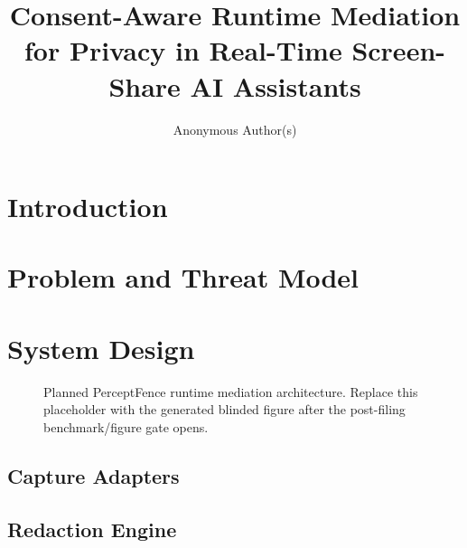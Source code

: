 \documentclass[manuscript,review,anonymous]{acmart}
\title[Consent-Aware Runtime Mediation for Screen-Share AI]{Consent-Aware Runtime Mediation for Privacy in Real-Time Screen-Share AI Assistants}
\author{Anonymous Author(s)}
\affiliation{%
  \institution{Anonymous Institution(s)}
  \country{Anonymous Country}}
\begin{document}
\maketitle

\section{Introduction}

\section{Problem and Threat Model}


\section{System Design}
\begin{figure}[t]
  \centering
  \caption{Planned PerceptFence runtime mediation architecture. Replace this placeholder with the generated blinded figure after the post-filing benchmark/figure gate opens.}
  \label{fig:architecture-placeholder}
\end{figure}

\subsection{Capture Adapters}

\subsection{Redaction Engine}
\end{document}
